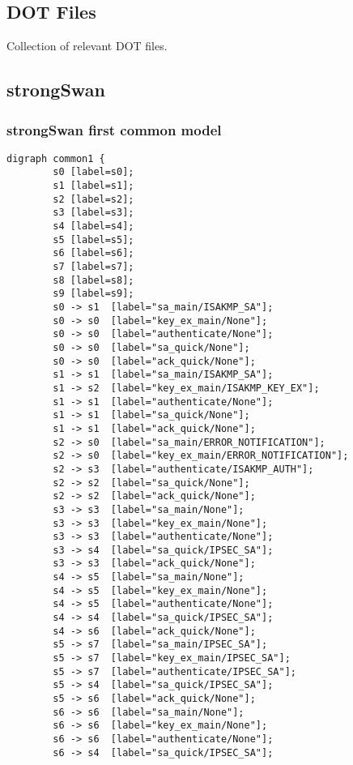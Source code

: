 \begin{appendices}

%
%
% 

\chapter{DOT Files}
Collection of relevant DOT\cite{dot} files.
\label{app::dot}
\section*{strongSwan}
\subsection*{strongSwan first common model}
\begin{lstlisting}[numbers=none]
	digraph common1 {
		s0 [label=s0];
		s1 [label=s1];
		s2 [label=s2];
		s3 [label=s3];
		s4 [label=s4];
		s5 [label=s5];
		s6 [label=s6];
		s7 [label=s7];
		s8 [label=s8];
		s9 [label=s9];
		s0 -> s1  [label="sa_main/ISAKMP_SA"];
		s0 -> s0  [label="key_ex_main/None"];
		s0 -> s0  [label="authenticate/None"];
		s0 -> s0  [label="sa_quick/None"];
		s0 -> s0  [label="ack_quick/None"];
		s1 -> s1  [label="sa_main/ISAKMP_SA"];
		s1 -> s2  [label="key_ex_main/ISAKMP_KEY_EX"];
		s1 -> s1  [label="authenticate/None"];
		s1 -> s1  [label="sa_quick/None"];
		s1 -> s1  [label="ack_quick/None"];
		s2 -> s0  [label="sa_main/ERROR_NOTIFICATION"];
		s2 -> s0  [label="key_ex_main/ERROR_NOTIFICATION"];
		s2 -> s3  [label="authenticate/ISAKMP_AUTH"];
		s2 -> s2  [label="sa_quick/None"];
		s2 -> s2  [label="ack_quick/None"];
		s3 -> s3  [label="sa_main/None"];
		s3 -> s3  [label="key_ex_main/None"];
		s3 -> s3  [label="authenticate/None"];
		s3 -> s4  [label="sa_quick/IPSEC_SA"];
		s3 -> s3  [label="ack_quick/None"];
		s4 -> s5  [label="sa_main/None"];
		s4 -> s5  [label="key_ex_main/None"];
		s4 -> s5  [label="authenticate/None"];
		s4 -> s4  [label="sa_quick/IPSEC_SA"];
		s4 -> s6  [label="ack_quick/None"];
		s5 -> s7  [label="sa_main/IPSEC_SA"];
		s5 -> s7  [label="key_ex_main/IPSEC_SA"];
		s5 -> s7  [label="authenticate/IPSEC_SA"];
		s5 -> s4  [label="sa_quick/IPSEC_SA"];
		s5 -> s6  [label="ack_quick/None"];
		s6 -> s6  [label="sa_main/None"];
		s6 -> s6  [label="key_ex_main/None"];
		s6 -> s6  [label="authenticate/None"];
		s6 -> s4  [label="sa_quick/IPSEC_SA"];

\end{lstlisting}
\end{appendices}
